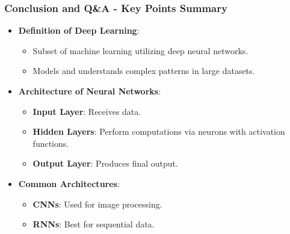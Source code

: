 \documentclass[aspectratio=169]{beamer}
\begin{document}
\begin{frame}[fragile]
    \frametitle{Conclusion and Q\&A - Key Points Summary}
    
    \begin{itemize}
        \item \textbf{Definition of Deep Learning}:
        \begin{itemize}
            \item Subset of machine learning utilizing deep neural networks.
            \item Models and understands complex patterns in large datasets.
        \end{itemize}
        
        \item \textbf{Architecture of Neural Networks}:
        \begin{itemize}
            \item \textbf{Input Layer}: Receives data.
            \item \textbf{Hidden Layers}: Perform computations via neurons with activation functions.
            \item \textbf{Output Layer}: Produces final output.
        \end{itemize}
        
        \item \textbf{Common Architectures}:
        \begin{itemize}
            \item \textbf{CNNs}: Used for image processing.
            \item \textbf{RNNs}: Best for sequential data.
        \end{itemize}
    \end{itemize}
\end{frame}
\end{document}
